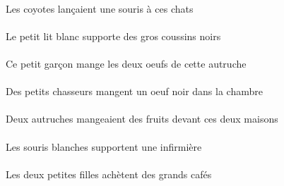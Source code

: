 \begin{exe}
\DEFPlErgP{}   \coyoteCPlErgP{}    \DEMPlDatP{}   \chatDPlDatP{}   \INDSgAbsP{}   \sourisBSgAbsP{}  \lancerVdPstBSgP{}\\
Les coyotes lançaient une souris à ces chats
\ex\gll
\DEFSgErg{}   \petitDSg{}   \blancDSg{}   \litDSgErg{}   \INDPlAbs{}   \grosBPl{}   \noirBPl{}   \coussinBPlAbs{}  \supporterVtPrsBPl{}\\
\DEFSgErgP{}   \petitDSgP{}   \blancDSgP{}   \litDSgErgP{}   \INDPlAbsP{}   \grosBPlP{}   \noirBPlP{}   \coussinBPlAbsP{}  \supporterVtPrsBPlP{}\\
Le petit lit blanc supporte des gros coussins noirs
\ex\gll
\DEMSgErg{}   \petitDSg{}   \garconDSgErg{}   \DEFDuAbs{}    \DEMSgObl{}   \autrucheBSgObl{}   \DE{}   \oeufCDuAbs{}  \mangerVtPrsCDu{}\\
\DEMSgErgP{}   \petitDSgP{}   \garconDSgErgP{}   \DEFDuAbsP{}    \DEMSgOblP{}   \autrucheBSgOblP{}   \DEP{}   \oeufCDuAbsP{}  \mangerVtPrsCDuP{}\\
Ce petit garçon mange les deux oeufs de cette autruche
\ex\gll
\DEFSgObl{}   \chambreBSgObl{}   \DANS{}   \INDPlErg{}   \petitCPl{}   \chasseurCPlErg{}   \INDSgAbs{}   \noirCSg{}   \oeufCSgAbs{}  \mangerVtPrsCSg{}\\
\DEFSgOblP{}   \chambreBSgOblP{}   \DANSP{}   \INDPlErgP{}   \petitCPlP{}   \chasseurCPlErgP{}   \INDSgAbsP{}   \noirCSgP{}   \oeufCSgAbsP{}  \mangerVtPrsCSgP{}\\
Des petits chasseurs mangent un oeuf noir dans la chambre
\ex\gll
\DEMDuObl{}   \maisonDDuObl{}   \DEVANT{}   \INDDuErg{}   \autrucheBDuErg{}   \INDPlAbs{}   \fruitAPlAbs{}  \mangerVtPstAPl{}\\
\DEMDuOblP{}   \maisonDDuOblP{}   \DEVANTP{}   \INDDuErgP{}   \autrucheBDuErgP{}   \INDPlAbsP{}   \fruitAPlAbsP{}  \mangerVtPstAPlP{}\\
Deux autruches mangeaient des fruits devant ces deux maisons
\ex\gll
\DEFPlErg{}   \blancBPl{}   \sourisBPlErg{}   \INDSgAbs{}   \infirmiereASgAbs{}  \supporterVtPrsASg{}\\
\DEFPlErgP{}   \blancBPlP{}   \sourisBPlErgP{}   \INDSgAbsP{}   \infirmiereASgAbsP{}  \supporterVtPrsASgP{}\\
Les souris blanches supportent une infirmière
\ex\gll
\DEFDuErg{}   \petitCDu{}   \filleCDuErg{}   \INDPlAbs{}   \grandCPl{}   \cafeCPlAbs{}  \acheterVtPrsCPl{}\\
\DEFDuErgP{}   \petitCDuP{}   \filleCDuErgP{}   \INDPlAbsP{}   \grandCPlP{}   \cafeCPlAbsP{}  \acheterVtPrsCPlP{}\\
Les deux petites filles achètent des grands cafés

\end{exe}
